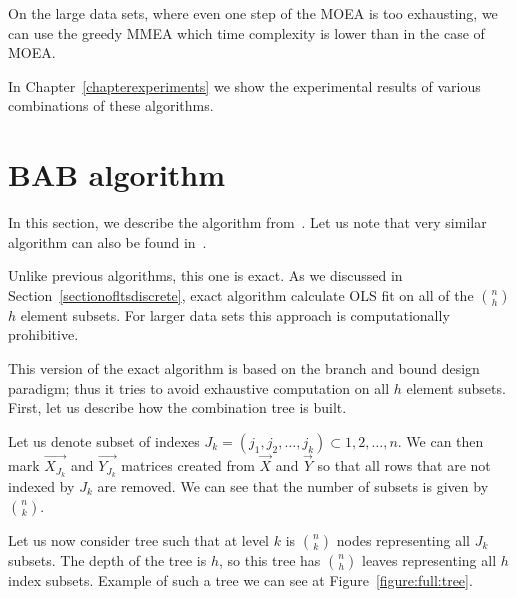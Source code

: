 On the large data sets, where even one step of the MOEA is too exhausting, we can use the greedy MMEA which time complexity is lower than in the case of MOEA.

In Chapter~\ref{chapterexperiments} we show the experimental results of various combinations of these algorithms.





\section{BAB algorithm} \label{sectionbab}
In this section, we describe the algorithm from~\cite{agullo2001new}. Let us note that very similar algorithm can also be found in~\cite{hofmann2010matrix}.

Unlike previous algorithms, this one is exact. As we discussed in Section~\ref{sectionofltsdiscrete}, exact algorithm calculate OLS fit on all of the $\binom{n}{h}$ $h$ element subsets. For larger data sets this approach is computationally prohibitive.

This version of the exact algorithm is based on the branch and bound design paradigm; thus it tries to avoid exhaustive computation on all $h$ element subsets. First, let us describe how the combination tree is built. 

Let us denote subset of indexes 
$J_k = (j_1, j_2, \ldots , j_k) \subset {1,2,\ldots , n}$. We can then mark
$\vec{ X_{J_k} }$ and $\vec{ Y_{J_k} }$ matrices created from $\vec{X}$
and $\vec{Y}$ so that all rows that are not indexed by $J_k$ are removed.
We can see that the number of subsets is given by $\binom{n}{k}$.

Let us now consider tree such that at level $k$ is $\binom{n}{k}$ nodes representing all $J_k$ subsets. The depth of the tree is $h$, so this tree has $\binom{n}{h}$ leaves representing all $h$ index subsets. Example of such a tree we can see at Figure~\ref{figure:full:tree}.

